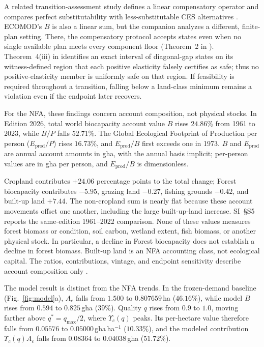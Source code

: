\documentclass[preprint,12pt,authoryear]{elsarticle}
\newcommand{\Ups}{\Upsilon_c}
\begin{document}
A related transition-assessment study defines a linear compensatory operator and compares perfect substitutability with less-substitutable CES alternatives \citep[Sections~2 and 4 of][]{Abaee2026b}. ECOMOD's $B$ is also a linear sum, but the companion analyzes a different, finite-plan setting. There, the compensatory protocol accepts states even when no single available plan meets every component floor (Theorem~2 in \citet{Abaee2026b}). Theorem~4(iii) in \citet{Abaee2026b} identifies an exact interval of diagonal-gap states on its witness-defined region that each positive elasticity falsely certifies as safe; thus no positive-elasticity member is uniformly safe on that region. If feasibility is required throughout a transition, falling below a land-class minimum remains a violation even if the endpoint later recovers.

For the NFA, these findings concern account composition, not physical stocks. In Edition 2026, total world biocapacity account value $B$ rises $24.86\%$ from 1961 to 2023, while $B/P$ falls $52.71\%$. The Global Ecological Footprint of Production per person ($E_{\mathrm{prod}}/P$) rises $16.73\%$, and $E_{\mathrm{prod}}/B$ first exceeds one in 1973. $B$ and $E_{\mathrm{prod}}$ are annual account amounts in gha, with the annual basis implicit; per-person values are in gha per person, and $E_{\mathrm{prod}}/B$ is dimensionless.

Cropland contributes $+24.06$ percentage points to the total change; Forest biocapacity contributes $-5.95$, grazing land $-0.27$, fishing grounds $-0.42$, and built-up land $+7.44$. The non-cropland sum is nearly flat because these account movements offset one another, including the large built-up-land increase. SI~\S S5 reports the same-edition 1961--2022 comparison. None of these values measures forest biomass or condition, soil carbon, wetland extent, fish biomass, or another physical stock. In particular, a decline in Forest biocapacity does not establish a decline in forest biomass. Built-up land is an NFA accounting class, not ecological capital. The ratios, contributions, vintage, and endpoint sensitivity describe account composition only \citep{Lo2026NFA,Borucke2013,Blomqvist2013,GiampietroSaltelli2014,Galli2016,vdBerghGrazi2015}.

The model result is distinct from the NFA trends. In the frozen-demand baseline (Fig.~\ref{fig:model}a), $A_c$ falls from $1.500$ to $0.807659$\,ha ($46.16\%$), while model $B$ rises from $0.594$ to $0.825$\,gha ($39\%$). Quality $q$ rises from $0.9$ to $1.0$, moving farther above $q^*=q_{\max}/2$, where $\Ups(q)$ peaks. Its per-hectare value therefore falls from $0.05576$ to $0.05000$\,gha\,ha$^{-1}$ ($10.33\%$), and the modeled contribution $\Ups(q)A_c$ falls from $0.08364$ to $0.04038$\,gha ($51.72\%$).
\end{document}
